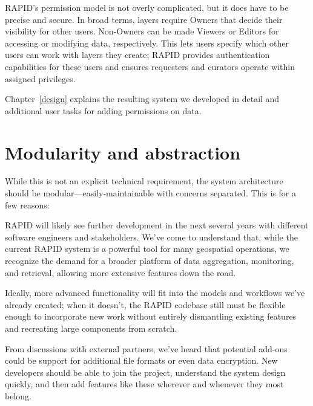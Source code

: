 RAPID's permission model is not overly complicated, but it does have to be precise and secure. In broad terms, layers require Owners that decide their visibility for other users. Non-Owners can be made Viewers or Editors for accessing or modifying data, respectively. This lets users specify which other users can work with layers they create; RAPID provides authentication capabilities for these users and ensures requesters and curators operate within assigned privileges.

Chapter~\ref{design} explains the resulting system we developed in detail and additional user tasks for adding permissions on data.

\section{Modularity and abstraction}
While this is not an explicit technical requirement, the system architecture should be modular---easily-maintainable with concerns separated. This is for a few reasons:

RAPID will likely see further development in the next several years with different software engineers and stakeholders. We've come to understand that, while the current RAPID system is a powerful tool for many geospatial operations, we recognize the demand for a broader platform of data aggregation, monitoring, and retrieval, allowing more extensive features down the road.

Ideally, more advanced functionality will fit into the models and workflows we've already created; when it doesn't, the RAPID codebase still must be flexible enough to incorporate new work without entirely dismantling existing features and recreating large components from scratch.

From discussions with external partners, we've heard that potential add-ons could be support for additional file formats or even data encryption. New developers should be able to join the project, understand the system design quickly, and then add features like these wherever and whenever they most belong.